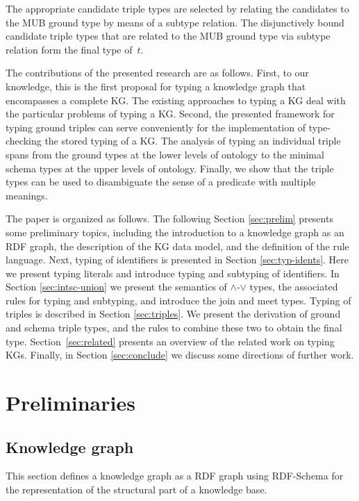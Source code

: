 \documentclass[runningheads]{llncs}
\begin{document}
The appropriate candidate triple types are selected by relating the
candidates to the MUB ground type by means of a subtype relation. The
disjunctively bound candidate triple types that are related to the MUB
ground type via subtype relation form the final type of~$t$.

The contributions of the presented research are as follows. First, to
our knowledge, this is the first proposal for typing a knowledge graph
that encompasses a complete KG. The existing approaches to typing a KG
deal with the particular problems of typing a KG. Second, the
presented framework for typing ground triples can serve conveniently
for the implementation of type-checking the stored typing of a KG. The
analysis of typing an individual triple spans from the ground types at
the lower levels of ontology to the minimal schema types at the upper
levels of ontology. Finally, we show that the triple types can be used
to disambiguate the sense of a predicate with multiple meanings.

The paper is organized as follows. The following Section
\ref{sec:prelim} presents some preliminary topics, including the
introduction to a knowledge graph as an RDF graph, the description of
the KG data model, and the definition of the rule language. Next,
typing of identifiers is presented in Section
\ref{sec:typ-idents}. Here we present typing literals and introduce
typing and subtyping of identifiers. In Section \ref{sec:intsc-union}
we present the semantics of $\land$-$\lor$ types, the associated rules
for typing and subtyping, and introduce the join and meet
types. Typing of triples is described in Section \ref{sec:triples}. We
present the derivation of ground and schema triple types, and the
rules to combine these two to obtain the final
type. Section~\ref{sec:related} presents an overview of the related
work on typing KGs. Finally, in Section \ref{sec:conclude} we discuss
some directions of further work.






\section{Preliminaries\label{sec:prelim}}


\subsection{Knowledge graph\label{sec:kg}}

This section defines a knowledge graph as a RDF graph \cite{rdf} using
RDF-Schema \cite{rdfschema} for the representation of the structural
part of a knowledge base. 
\end{document}

